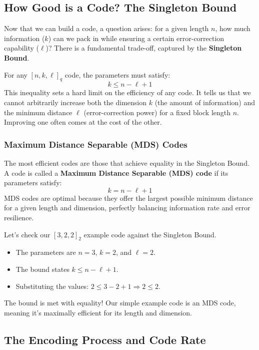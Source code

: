 \documentclass{article}
\begin{document}
\subsection{How Good is a Code? The Singleton Bound}

Now that we can build a code, a question arises: for a given length $n$, how much information ($k$) can we pack in while ensuring a certain error-correction capability ($\ell$)? There is a fundamental trade-off, captured by the \textbf{Singleton Bound}.

For any $[n, k, \ell]_q$ code, the parameters must satisfy:
\[
k \leq n - \ell + 1
\]
This inequality sets a hard limit on the efficiency of any code. It tells us that we cannot arbitrarily increase both the dimension $k$ (the amount of information) and the minimum distance $\ell$ (error-correction power) for a fixed block length $n$. Improving one often comes at the cost of the other.

\subsubsection{Maximum Distance Separable (MDS) Codes}

The most efficient codes are those that achieve equality in the Singleton Bound. A code is called a \textbf{Maximum Distance Separable (MDS) code} if its parameters satisfy:
\[
k = n - \ell + 1
\]
MDS codes are optimal because they offer the largest possible minimum distance for a given length and dimension, perfectly balancing information rate and error resilience.

\begin{tcolorbox}[title={Example: Checking for MDS Property}]
Let's check our $[3, 2, 2]_2$ example code against the Singleton Bound.
\begin{itemize}
    \item The parameters are $n=3$, $k=2$, and $\ell=2$.
    \item The bound states $k \leq n - \ell + 1$.
    \item Substituting the values: $2 \leq 3 - 2 + 1 \Rightarrow 2 \leq 2$.
\end{itemize}
The bound is met with equality! Our simple example code is an MDS code, meaning it's maximally efficient for its length and dimension.
\end{tcolorbox}



\subsection{The Encoding Process and Code Rate}
\end{document}

